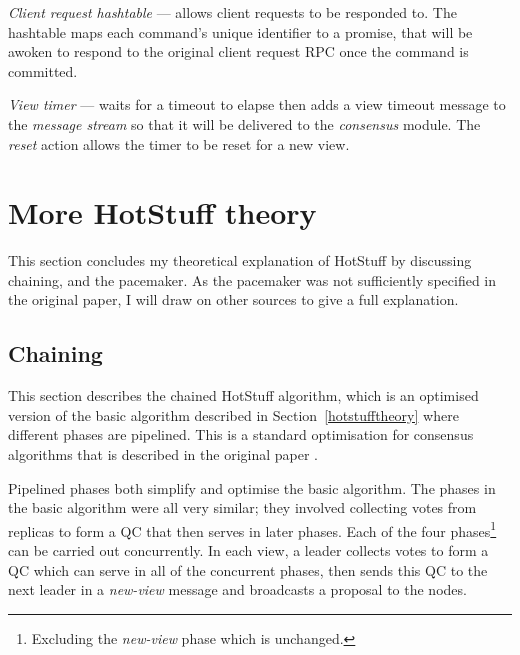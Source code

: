 \begin{description}
	\item \textit{Client request hashtable} --- allows client requests to be responded to. The hashtable maps each command's unique identifier to a promise, that will be awoken to respond to the original client request RPC once the command is committed.
	\item \textit{View timer} --- waits for a timeout to elapse then adds a view timeout message to the \textit{message stream} so that it will be delivered to the \textit{consensus} module. The \textit{reset} action allows the timer to be reset for a new view.
\end{description}

\section{More HotStuff theory} \label{moretheory}
This section concludes my theoretical explanation of HotStuff by discussing chaining, and the pacemaker. As the pacemaker was not sufficiently specified in the original paper, I will draw on other sources to give a full explanation.

\subsection{Chaining} \label{chaining}

This section describes the chained HotStuff algorithm, which is an optimised version of the basic algorithm described in Section~\ref{hotstufftheory} where different phases are pipelined. This is a standard optimisation for consensus algorithms that is described in the original paper \cite{yinHotStuffBFTConsensus2019}.

Pipelined phases both simplify and optimise the basic algorithm. The phases in the basic algorithm were all very similar; they involved collecting votes from replicas to form a QC that then serves in later phases. Each of the four phases\footnote{Excluding the \textit{new-view} phase which is unchanged.} can be carried out concurrently. In each view, a leader collects votes to form a QC which can serve in all of the concurrent phases, then sends this QC to the next leader in a \textit{new-view} message and broadcasts a proposal to the nodes. 


